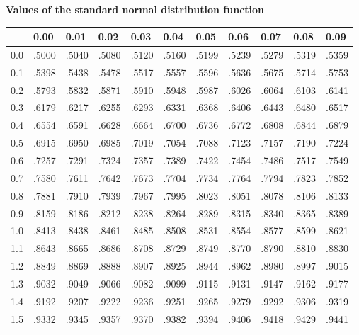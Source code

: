 \documentclass[a4paper]{article}
\begin{document}
\rule{0mm}{14mm}
\begin{center}
  {\Large\bf Values of the standard normal distribution function}
\end{center}

\rule{0mm}{5mm}
\pagestyle{empty}
\thispagestyle{empty}
\begin{table}[ht]
\centering
\begin{tabular}{rllllllllll}
  \hline \rule{0mm}{4mm}
 & 0.00 & 0.01 & 0.02 & 0.03 & 0.04 & 0.05 & 0.06 & 0.07 & 0.08 & 0.09 \\[2mm]
  \hline
  0.0 & .5000 & .5040 & .5080 & .5120 & .5160 & .5199 & .5239 & .5279 & .5319 & .5359 \\ 
  0.1 & .5398 & .5438 & .5478 & .5517 & .5557 & .5596 & .5636 & .5675 & .5714 & .5753 \\ 
  0.2 & .5793 & .5832 & .5871 & .5910 & .5948 & .5987 & .6026 & .6064 & .6103 & .6141 \\ 
  0.3 & .6179 & .6217 & .6255 & .6293 & .6331 & .6368 & .6406 & .6443 & .6480 & .6517 \\ 
  0.4 & .6554 & .6591 & .6628 & .6664 & .6700 & .6736 & .6772 & .6808 & .6844 & .6879 \\[3mm]
  0.5 & .6915 & .6950 & .6985 & .7019 & .7054 & .7088 & .7123 & .7157 & .7190 & .7224 \\ 
  0.6 & .7257 & .7291 & .7324 & .7357 & .7389 & .7422 & .7454 & .7486 & .7517 & .7549 \\ 
  0.7 & .7580 & .7611 & .7642 & .7673 & .7704 & .7734 & .7764 & .7794 & .7823 & .7852 \\ 
  0.8 & .7881 & .7910 & .7939 & .7967 & .7995 & .8023 & .8051 & .8078 & .8106 & .8133 \\ 
  0.9 & .8159 & .8186 & .8212 & .8238 & .8264 & .8289 & .8315 & .8340 & .8365 & .8389 \\ 
  1.0 & .8413 & .8438 & .8461 & .8485 & .8508 & .8531 & .8554 & .8577 & .8599 & .8621 \\[3mm]
  1.1 & .8643 & .8665 & .8686 & .8708 & .8729 & .8749 & .8770 & .8790 & .8810 & .8830 \\ 
  1.2 & .8849 & .8869 & .8888 & .8907 & .8925 & .8944 & .8962 & .8980 & .8997 & .9015 \\ 
  1.3 & .9032 & .9049 & .9066 & .9082 & .9099 & .9115 & .9131 & .9147 & .9162 & .9177 \\ 
  1.4 & .9192 & .9207 & .9222 & .9236 & .9251 & .9265 & .9279 & .9292 & .9306 & .9319 \\ 
  1.5 & .9332 & .9345 & .9357 & .9370 & .9382 & .9394 & .9406 & .9418 & .9429 & .9441 \\[3mm] 

\end{tabular}
\end{table}
\end{document}
